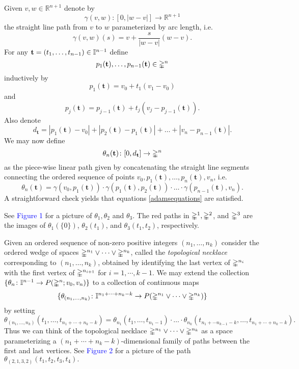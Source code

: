 Given $v,w \in \mathbb{R}^{n+1}$ denote by
\[\gamma(v,w) \colon [0, |w - v|] \to \mathbb{R}^{n+1}\] 
the straight line path from $v$ to $w$ parameterized by arc length, i.e.
\[\gamma(v,w)(s)= v+\frac{s}{|w-v|}(w-v).\]
For any $\mathbf{t}=(t_1, \dots, t_{n-1}) \in \mathbb{I}^{n-1}$ define
\[
p_1(\mathbf{t}), \dots, p_{n-1}(\mathbf{t}) \in \mathbb{\Delta}^n
\]
inductively by
\[
p_1(\mathbf{t})=v_0+ t_1(v_1-v_0)
\]
and
\[
p_j(\mathbf{t})= p_{j-1}(\mathbf{t}) + t_j(v_j-p_{j-1}(\mathbf{t})).
\]
Also denote 
\[
d_{\mathbf{t}}= |p_1(\mathbf{t})- v_0| + |p_2(\mathbf{t})-p_1(\mathbf{t})| + \dots + |v_n - p_{n-1}(\mathbf{t})|.
\]
We may now define 
\[
\theta_n(\mathbf{t}) \colon [0, d_{\mathbf{t}}] \to \mathbb{\Delta}^n
\]
as the piece-wise linear path given by concatenating the straight line segments connecting the ordered sequence of points $v_0, p_1(\mathbf{t}), \dots, p_n(\mathbf{t}), v_n$, i.e.
\[
\theta_n(\mathbf{t}) = \gamma(v_0,p_1(\mathbf{t})) \cdot \gamma(p_1(\mathbf{t}), p_2(\mathbf{t})) \cdot \ldots \cdot \gamma(p_{n-1}(\mathbf{t}),v_n).
\]
A straightforward check yields that equations \ref{adamsequations} are satisfied. 

See \textcolor{blue}{Figure 1} for a picture of $\theta_1, \theta_2$ and $\theta_3$. The red paths in $\mathbb{\Delta}^1, \mathbb{\Delta}^2$, and $\mathbb{\Delta}^3$ are the images of $\theta_1(\{0\})$, $\theta_2(t_1)$, and $\theta_3(t_1,t_2)$, respectively. 

Given an ordered sequence of non-zero positive integers $(n_1, \ldots, n_k)$ consider the ordered wedge of spaces $\mathbb{\Delta}^{n_1} \vee \cdots \vee \mathbb{\Delta}^{n_k}$, called the \textit{topological necklace} corresponding to $(n_1, \ldots, n_k)$, obtained by identifying the last vertex of $\mathbb{\Delta}^{n_i}$ with the first vertex of $\mathbb{\Delta}^{n_{i+1}}$ for $i=1, \cdots, k-1$. %
We may extend the collection $\{ \theta_n \colon \mathbb{I}^{n-1} \to P(\mathbb{\Delta}^n;v_0,v_n)\}$ to a collection of continuous maps 
\[ \{ \theta_{(n_1, \ldots, n_k)} \colon \mathbb{I}^{n_1 + \cdots + n_k-k} \to P(\mathbb{\Delta}^{n_1} \vee \cdots \vee \mathbb{\Delta}^{n_k})\} \]
by setting
\[\theta_{(n_1, \ldots, n_k)}(t_1, \ldots, t_{n_1+ \cdots + n_k-k})= \theta_{n_1}(t_1, \ldots, t_{n_1-1})\cdot \ldots \cdot \theta_{n_k}(t_{n_1+ \cdots n_{k-1}-k},\ldots,t_{n_1 + \cdots +n_k-k}).\]
Thus we can think of the topological necklace $\mathbb{\Delta}^{n_1} \vee \cdots \vee \mathbb{\Delta}^{n_k}$ as a space parameterizing a $(n_1+ \cdots + n_k-k)$-dimensional family of paths between the first and last vertices. See \textcolor{blue}{Figure 2} for a picture of the path $\theta_{(2,1,3,2)}(t_1,t_2,t_3,t_4).$

